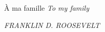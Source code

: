 

\begin{minipage}[t]{\linewidth}
\null\hfill \`A  ma famille\linebreak
\null\hfill {\it To my family}
\end{minipage}

{
\null\vfill
\begin{center}
\parbox{0.5\linewidth}{%
	\raggedright{\normalsize\itshape%
		\par\bigskip
	}   
	\raggedleft\normalsize\MakeUppercase{\textit{Franklin D. Roosevelt}}\par%
}
\end{center}
\vfill\vfill
}
